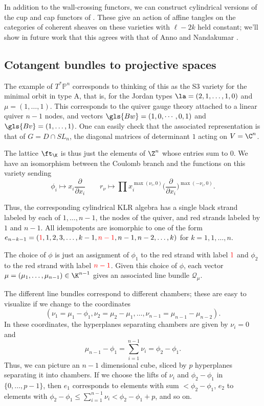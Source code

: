 In addition to the wall-crossing functors, we can construct cylindrical versions of the cup and cap functors of \cite[Def. 2.3]{WebTGK}. These give an action of affine tangles on the categories of coherent sheaves on these varieties with $\ell-2k$ held constant; we'll show in future work that this agrees with that of Anno and Nandakumar \cite{ANexotic}.

\subsection{Cotangent bundles to projective spaces}
The example of $T^*\mathbb{P}^n$  corresponds to thinking of this as the S3 variety for the minimal orbit in type A, that is, for the Jordan types $\la=(2,1,\dots, 1,0)$ and $\mu=(1,\dots, 1)$.  This corresponds to the quiver gauge theory attached to a linear quiver $n-1$ nodes, and vectors $\gls{Bw}=(1,0,\cdots,0,1)$ and $\gls{Bv}=(1,\dots, 1)$. 
One can easily check that the associated representation is that of 
 $G=D\cap SL_n$, the diagonal matrices of determinant $1$ acting on $V=\C^n$.  
 
 
 The lattice $\ft_{\K}$ is thus just the elements of $\Z^n$ whose entries sum to 0.  We have an isomorphism between the Coulomb branch and the functions on this variety sending \[\phi_i\mapsto x_i\frac{\partial}{\partial x_i}\qquad r_{\nu}\mapsto \prod x_i^{\max(\nu_i,0)}\Big(\frac{\partial}{\partial x_i}\Big)^{\max(-\nu_i,0)}.\]


Thus, the corresponding cylindrical KLR algebra has a single black strand labeled by each of $1,\dots, n-1$, the nodes of the quiver, and red strands labeled by $1$ and $n-1$.  All idempotents are isomorphic to one of the form $e_{n-k-1}=({\color{red} 1}, 1,2,3,\dots, k-1, {\color{red} n-1}, n-1, n-2, \dots,k)$ for $k=1, 1,\dots, n$.

The choice of $\phi$ is just an assignment of $\phi_1$ to the red strand with label ${\color{red} 1}$ and $\phi_2$ to the red strand with label ${\color{red} n-1}$.  Given this choice of $\phi$, each vector   $\mu=(\mu_1,\dots, \mu_{n-1})\in \K^{n-1}$ gives an associated line bundle $\mathcal{Q}_\mu$.

The different line bundles correspond to different chambers; these are easy to visualize if we change to the coordinates \[(\nu_1=\mu_1-\phi_1,\nu_2=\mu_2-\mu_1,\dots, \nu_{n-1}=\mu_{n-1}-\mu_{n-2}).\]  In these coordinates, the hyperplanes separating chambers are given by $\nu_i=0$ and \[\mu_{n-1}-\phi_1=\sum_{i=1}^{n-1}\nu_i=\phi_2-\phi_1.\]  Thus, we can picture an $n-1$ dimensional cube, sliced by $p$ hyperplanes separating it into chambers.  If we choose the lifts of $\nu_i$ and $\phi_2-\phi_1$ in $\{0,\dots, p-1\}$,  then $e_{1}$ corresponds to elements with sum $<\phi_2-\phi_1$, $e_{2}$ to elements with $\phi_2-\phi_1\leq \sum_{i=1}^{n-1}\nu_i< \phi_2-\phi_1+p$, and so on.  


